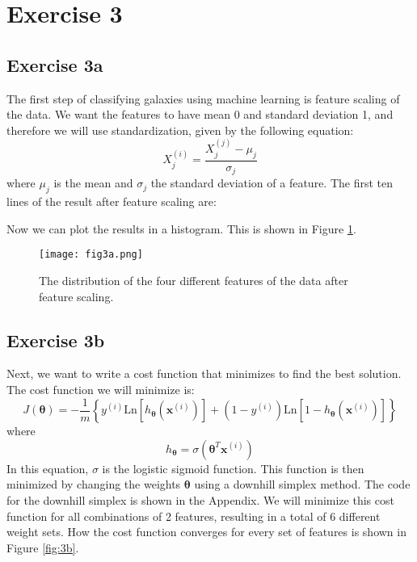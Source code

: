 \section{Exercise 3}

\subsection{Exercise 3a}
The first step of classifying galaxies using machine learning is feature scaling of the data. We want the features to have mean 0 and standard deviation 1, and therefore we will use standardization, given by the following equation: 
\begin{equation}
    X_j^{(i)} = \frac{X_j^{(j)} - \mu_j}{\sigma_j}
\end{equation}
where $\mu_j$ is the mean and $\sigma_j$ the standard deviation of a feature. The first ten lines of the result after feature scaling are: 



Now we can plot the results in a histogram. This is shown in Figure \ref{fig:3a}.

\begin{figure}[h!]
  \centering
  \texttt{[image: fig3a.png]}
  \caption{The distribution of the four different features of the data after feature scaling.}
  \label{fig:3a}
\end{figure}

\subsection{Exercise 3b}
Next, we want to write a cost function that minimizes to find the best solution. The cost function we will minimize is: 
\begin{equation}
    J(\boldsymbol{\theta}) = -\frac{1}{m}\left\{ y^{(i)} \mathrm{Ln}\left[ h_{\boldsymbol{\theta}}(\mathbf{x}^{(i)}) \right] + (1 - y^{(i)}) \mathrm{Ln}\left[ 1 -h_{\boldsymbol{\theta}}(\mathbf{x}^{(i)}) \right] \right\}
\end{equation}
where
\begin{equation}
    h_{\boldsymbol{\theta}} = \sigma (\boldsymbol{\theta}^T \mathbf{x}^{(i)})
\end{equation}
In this equation, $\sigma$ is the logistic sigmoid function. This function is then minimized by changing the weights $\boldsymbol{\theta}$ using a downhill simplex method. The code for the downhill simplex is shown in the Appendix. We will minimize this cost function for all combinations of 2 features, resulting in a total of 6 different weight sets. How the cost function converges for every set of features is shown in Figure \ref{fig:3b}.

